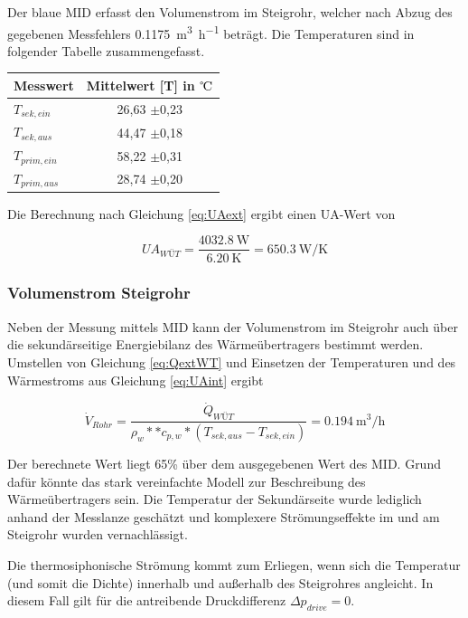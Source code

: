 Der blaue MID erfasst den Volumenstrom im Steigrohr, welcher nach Abzug des gegebenen Messfehlers \SI{0,1175}{\cubic\meter\per\hour} beträgt. Die Temperaturen sind in folgender Tabelle zusammengefasst.
\begin{center}
	\begin{tabular}{l|c}
		\label{tab:intWT}
		
		\textbf{Messwert} & \textbf{Mittelwert} [T] in ${\celsius}$\\
		\hline
		$T_{sek,ein}$ & 26,63 $\pm$0,23\\
		$T_{sek,aus}$ & 44,47 $\pm$0,18\\
		$T_{prim,ein}$ & 58,22 $\pm$0,31\\
		$T_{prim,aus}$ & 28,74 $\pm$0,20\\
	
		
	\end{tabular}
\end{center}

Die Berechnung nach Gleichung \ref{eq:UAext} ergibt einen UA-Wert von

\begin{equation}
	\label{eq:UAint}
		UA_{WÜT} = \frac{\SI{4032,8}{\watt}}{\SI{6,20}{\kelvin}} = \SI{650,3}{\watt\per\kelvin}
\end{equation}

\subsubsection{Volumenstrom Steigrohr}
Neben der Messung mittels MID kann der Volumenstrom im Steigrohr auch über die sekundärseitige Energiebilanz des Wärmeübertragers bestimmt werden. Umstellen von Gleichung \ref{eq:QextWT} und Einsetzen der Temperaturen und des Wärmestroms aus Gleichung \ref{eq:UAint} ergibt

\begin{equation}
	\label{eq:Vdot}
	\dot V_{Rohr}  =\frac{\dot Q_{WÜT}}{\rho_{w} *  * c_{p,w} * (T_{sek,aus}-T_{sek,ein})}  = \SI{0,194}{\cubic\meter\per\hour}
\end{equation}

Der berechnete Wert liegt 65\% über dem ausgegebenen Wert des MID. Grund dafür könnte das stark vereinfachte Modell zur Beschreibung des Wärmeübertragers sein. Die Temperatur der Sekundärseite wurde lediglich anhand der Messlanze geschätzt und komplexere Strömungseffekte im und am Steigrohr wurden vernachlässigt.


Die thermosiphonische Strömung kommt zum Erliegen, wenn sich die Temperatur (und somit die Dichte) innerhalb und außerhalb des Steigrohres angleicht. In diesem Fall gilt für die antreibende Druckdifferenz $\Delta p_{drive}=0$.  


